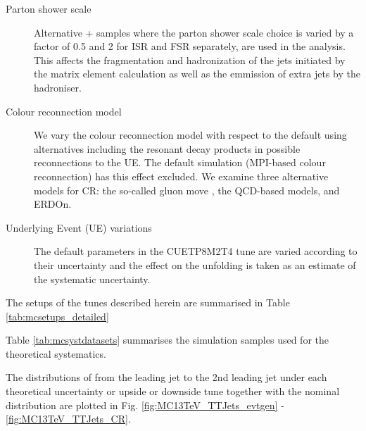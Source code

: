 \begin{description}
\begin{description}
  \item[Parton shower scale] Alternative \POWHEG +  samples where the parton shower scale choice is varied by a factor of 0.5 and 2 for ISR and FSR separately, are used in the analysis. This affects the fragmentation and hadronization of the jets initiated by the matrix element calculation as well as the emmission of extra jets by the hadroniser.

  \item[Colour reconnection model] We vary the colour reconnection model with respect to the default using alternatives including the resonant decay products in possible reconnections to the UE. The default simulation (MPI-based colour reconnection) has this effect excluded. We examine three alternative models for CR: the so-called gluon move \cite{Argyropoulos:2014zoa}, the QCD-based models\cite{Christiansen:2015yqa}, and ERDOn. 

  \item[Underlying Event (UE) variations] The default parameters in the CUETP8M2T4 tune are varied according to their uncertainty and the effect on the unfolding is taken as an estimate of the systematic uncertainty.
  \end{description}
  The setups of the \PYTHIA tunes described herein are summarised in Table \ref{tab:mcsetups_detailed}
\end{description}

Table \ref{tab:mcsystdatasets} summarises the simulation samples used for the theoretical systematics.

The distributions of \pullangle from the leading jet \leadingjet to the 2nd leading jet \scndleadingjet under each theoretical uncertainty or upside or downside \PYTHIA tune together with the nominal distribution are plotted in Fig. \ref{fig:MC13TeV_TTJets_evtgen} - \ref{fig:MC13TeV_TTJets_CR}.



